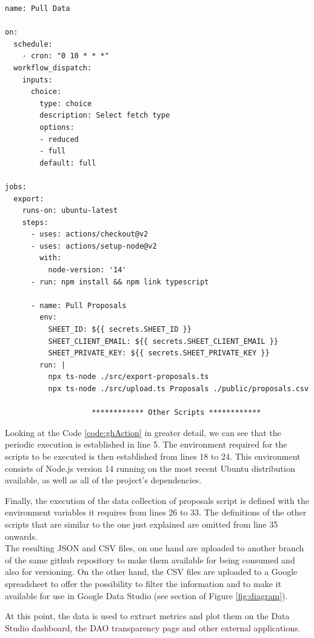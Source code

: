 \documentclass[MSE,Master,english]{twbook}%
\newcommand{\rom}[1]{\uppercase\expandafter{\romannumeral #1\relax}}
\begin{document}
\begin{lstlisting}[caption={Code snippet from the Github Action configuration file}, label={code:ghAction}]
name: Pull Data

on:
  schedule:
    - cron: "0 10 * * *"
  workflow_dispatch:
    inputs:
      choice:
        type: choice
        description: Select fetch type
        options:
        - reduced
        - full
        default: full

jobs:
  export:
    runs-on: ubuntu-latest
    steps:
      - uses: actions/checkout@v2
      - uses: actions/setup-node@v2
        with:
          node-version: '14'
      - run: npm install && npm link typescript

      - name: Pull Proposals
        env:
          SHEET_ID: ${{ secrets.SHEET_ID }}
          SHEET_CLIENT_EMAIL: ${{ secrets.SHEET_CLIENT_EMAIL }}
          SHEET_PRIVATE_KEY: ${{ secrets.SHEET_PRIVATE_KEY }}
        run: |
          npx ts-node ./src/export-proposals.ts
          npx ts-node ./src/upload.ts Proposals ./public/proposals.csv

                    ************ Other Scripts ************
\end{lstlisting}

Looking at the Code \ref{code:ghAction} in greater detail, we can see that the periodic execution is established in line 5. The environment required for the scripts to be executed is then established from lines 18 to 24. This environment consists of Node.js version 14 running on the most recent Ubuntu distribution available, as well as all of the project's dependencies.

Finally, the execution of the data collection of proposals script is defined with the environment variables it requires from lines 26 to 33. The definitions of the other scripts that are similar to the one just explained are omitted from line 35 onwards. \\

The resulting JSON and CSV files, on one hand are uploaded to another branch of the same github repository to make them available for being consumed and also for versioning. On the other hand, the CSV files are uploaded to a Google spreadsheet\cite{transparencySheet} to offer the possibility to filter the information and to make it available for use in Google Data Studio (see section \rom{4} of Figure \ref{fig:diagram}).

At this point, the data is used to extract metrics and plot them on the Data Studio dashboard, the DAO transparency page\cite{transparencyPage} and other external applications.
\end{document}
